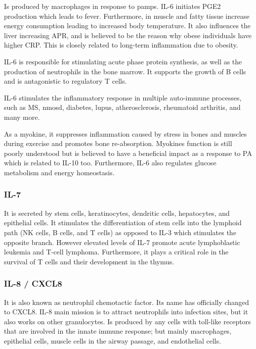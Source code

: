Is produced by macrophages in response to \gls{pamps}. IL-6 initiates PGE2 production which leads to fever. Furthermore, in muscle and fatty tissue increase energy consumption leading to increased body temperature. It also influences the liver increasing APR, and is believed to be the reason why obese individuals have higher CRP. This is closely related to long-term inflammation due to obesity.

IL-6 is responsible for stimulating acute phase protein synthesis, as well as the production of neutrophils in the bone marrow. It supports the growth of B cells and is antagonistic to regulatory T cells.

IL-6 stimulates the inflammatory response in multiple auto-immune processes, such as MS, \gls{nmosd}, diabetes, lupus, atherosclerosis, rheumatoid arthritis, and many more.

As a myokine, it suppresses inflammation caused by stress in bones and muscles during exercise and promotes bone re-absorption. Myokines function is still poorly understood but is believed to have a beneficial impact as a response to PA \cite{Ostrowski2000} which is related to IL-10 too. Furthermore, IL-6 also regulates glucose metabolism and energy homeostasis.

\subsubsection{IL-7}
\label{in:IL7}

It is secreted by stem cells, keratinocytes, dendritic cells, hepatocytes, and epithelial cells. It stimulates the differentiation of stem cells into the lymphoid path (NK cells, B cells, and T cells) as opposed to IL-3 which stimulates the opposite branch. However elevated levels of IL-7 promote acute lymphoblastic leukemia and T-cell lymphoma. Furthermore, it plays a critical role in the survival of T cells and their development in the thymus.

\subsubsection{IL-8 / CXCL8}
\label{in:IL8}

It is also known as neutrophil chemotactic factor. Its name has officially changed to CXCL8. IL-8 main mission is to attract neutrophils into infection sites, but it also works on other granulocytes. Is produced by any cells with toll-like receptors that are involved in the innate immune response; but mainly macrophages, epithelial cells, muscle cells in the airway passage, and endothelial cells.

